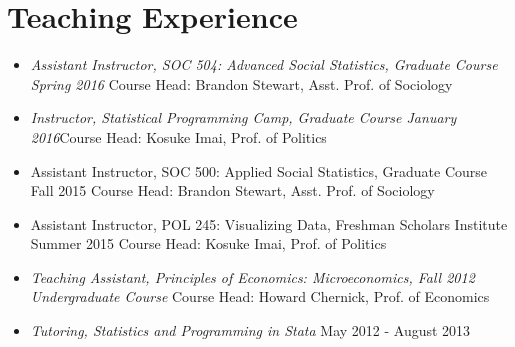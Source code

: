 \documentclass[11pt,a4paper,sans]{moderncv}
\begin{document}
\section{Teaching Experience}
\vspace{-5mm}
\begin{itemize}
	\item{\emph{Assistant Instructor, SOC 504: Advanced Social Statistics, Graduate Course \hspace{11mm}Spring 2016} \newline Course Head: Brandon Stewart, Asst. Prof. of Sociology}
	\item{\emph{Instructor, Statistical Programming Camp, Graduate Course \hspace{33mm} January 2016}\newline Course Head: Kosuke Imai, Prof. of Politics}
	\item{Assistant Instructor, SOC 500: Applied Social Statistics, Graduate Course \hspace{19mm}Fall 2015 \newline Course Head: Brandon Stewart, Asst. Prof. of Sociology}
	\item{Assistant Instructor, POL 245: Visualizing Data, Freshman Scholars Institute \hspace{8mm}Summer 2015 \newline Course Head: Kosuke Imai, Prof. of Politics}
\end{itemize}
\vspace{-5mm}
\begin{itemize}
	\item{\emph{Teaching Assistant, Principles of Economics: Microeconomics, \hspace{37mm}Fall 2012} \newline \emph{Undergraduate Course} \newline Course Head: Howard Chernick, Prof. of Economics}
	\item{\emph{Tutoring, Statistics and Programming in Stata} \hspace{40mm}May 2012 - August 2013}
\end{itemize}
\end{document}
